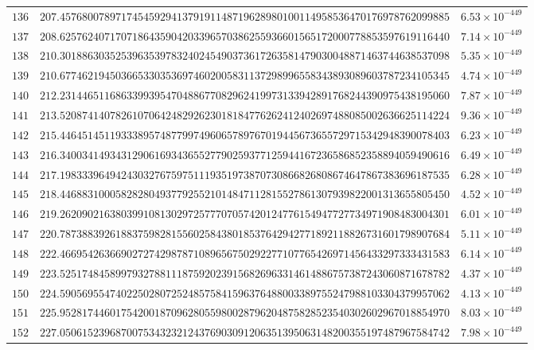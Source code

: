 \documentclass[12pt,reqno]{amsart}
\theoremstyle{plain}
\theoremstyle{definition}
\theoremstyle{remark}
\begin{document}
\begin{longtable}{clc}
$136$ & $207.4576800789717454592941379191148719628980100114958536470176978762099885$ & $6.53 \times 10^{-449}$ \\
$137$ & $208.6257624071707186435904203396570386255936601565172000778853597619116440$ & $7.14 \times 10^{-449}$ \\
$138$ & $210.3018863035253963539783240245490373617263581479030048871463744638537098$ & $5.35 \times 10^{-449}$ \\
$139$ & $210.6774621945036653303536974602005831137298996558343893089603787234105345$ & $4.74 \times 10^{-449}$ \\
$140$ & $212.2314465116863399395470488677082962419973133942891768244390975438195060$ & $7.87 \times 10^{-449}$ \\
$141$ & $213.5208741407826107064248292623018184776262412402697488085002636625114224$ & $9.36 \times 10^{-449}$ \\
$142$ & $215.4464514511933389574877997496065789767019445673655729715342948390078403$ & $6.23 \times 10^{-449}$ \\
$143$ & $216.3400341493431290616934365527790259377125944167236586852358894059490616$ & $6.49 \times 10^{-449}$ \\
$144$ & $217.1983339649424303276759751119351973870730866826808674647867383696187535$ & $6.28 \times 10^{-449}$ \\
$145$ & $218.4468831000582828049377925521014847112815527861307939822001313655805450$ & $4.52 \times 10^{-449}$ \\
$146$ & $219.2620902163803991081302972577707057420124776154947727734971908483004301$ & $6.01 \times 10^{-449}$ \\
$147$ & $220.7873883926188375982815560258438018537642942771892118826731601798907684$ & $5.11 \times 10^{-449}$ \\
$148$ & $222.4669542636690272742987871089656750292277107765426971456433297333431583$ & $6.14 \times 10^{-449}$ \\
$149$ & $223.5251748458997932788111875920239156826963314614886757387243060871678782$ & $4.37 \times 10^{-449}$ \\
$150$ & $224.5905695547402250280725248575841596376488003389755247988103304379957062$ & $4.13 \times 10^{-449}$ \\
$151$ & $225.9528174460175420018709628055980028796204875828523540302602967018854970$ & $8.03 \times 10^{-449}$ \\
$152$ & $227.0506152396870075343232124376903091206351395063148200355197487967584742$ & $7.98 \times 10^{-449}$ \\

\end{longtable}
\end{document}
